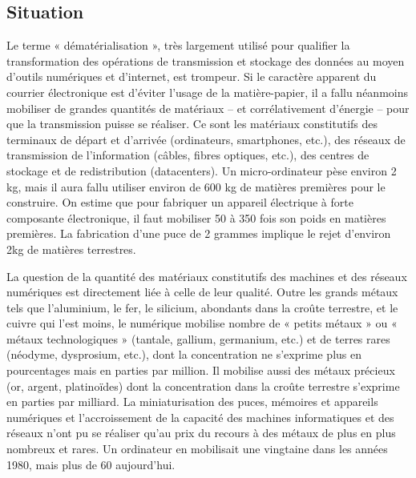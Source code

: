 \documentclass[a4paper]{article}
\begin{document}
\subsection{Situation}
Le terme « dématérialisation », très largement utilisé pour qualifier la transformation des opérations de transmission et stockage des données au moyen d’outils numériques et d’internet, est trompeur. Si le caractère apparent du courrier électronique est d’éviter l’usage de la matière-papier, il a fallu néanmoins mobiliser de grandes quantités de matériaux – et corrélativement d’énergie – pour que la transmission puisse se réaliser. Ce sont les matériaux constitutifs des terminaux de départ et d’arrivée (ordinateurs, smartphones, etc.), des réseaux de transmission de l’information (câbles, fibres optiques, etc.), des centres de stockage et de redistribution (datacenters). Un micro-ordinateur pèse environ 2 kg, mais il aura fallu utiliser environ de 600 kg de matières premières pour le construire. On estime que pour fabriquer un appareil électrique à forte composante électronique, il faut mobiliser 50 à 350 fois son poids en matières premières\cite{flipo2013face}. La fabrication d’une puce de 2 grammes implique le rejet d’environ 2kg de matières terrestres\cite{gossart2012impacts}.

La question de la quantité des matériaux constitutifs des machines et des réseaux numériques est directement liée à celle de leur qualité.  Outre les grands métaux tels que l’aluminium, le fer, le silicium, abondants dans la croûte terrestre, et le cuivre qui l’est moins, le numérique mobilise nombre de « petits métaux » ou « métaux technologiques » (tantale, gallium, germanium, etc.) et de terres rares (néodyme, dysprosium, etc.), dont la concentration ne s’exprime plus en pourcentages mais en parties par million. Il mobilise aussi des métaux précieux (or, argent, platinoïdes) dont la concentration dans la croûte terrestre s’exprime en parties par milliard. La miniaturisation des puces, mémoires et appareils numériques et l’accroissement de la capacité des machines informatiques et des réseaux n’ont pu se réaliser qu’au prix du recours à des métaux de plus en plus nombreux et rares. Un ordinateur en mobilisait une vingtaine dans les années 1980, mais plus de 60 aujourd’hui.
\end{document}
